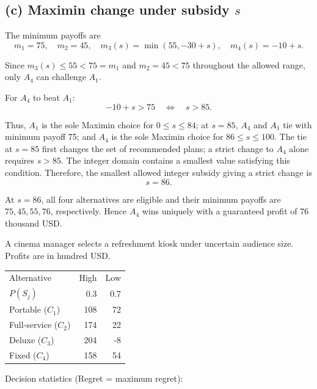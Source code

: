 \secInicio[sec:q1]

\label{sol:q1c}
\subsection*{(c) Maximin change under subsidy $s$ }

The minimum payoffs are
\[
m_1=75,\quad m_2=45,\quad
m_3(s)=\min(55,-30+s),\quad m_4(s)=-10+s.
\]

Since $m_3(s)\le55<75=m_1$ and $m_2=45<75$ throughout
the allowed range, only $A_4$ can challenge $A_1$.

For $A_4$ to beat $A_1$:
\[
-10+s>75
\quad\Longleftrightarrow\quad s>85.
\]

Thus, $A_1$ is the sole Maximin choice for $0\le s\le84$;
at $s=85$, $A_4$ and $A_1$ tie with minimum payoff 75;
and $A_4$ is the sole Maximin choice for $86\le s\le100$.
The tie at $s=85$ first changes the set of recommended plans;
a strict change to $A_4$ alone requires $s>85$.
The integer domain contains a smallest value satisfying this condition.
Therefore, the smallest allowed integer subsidy giving a strict change is
\[
\boxed{s=86}.
\]

At $s=86$, all four alternatives are eligible and their minimum
payoffs are $75,45,55,76$, respectively. Hence $A_4$ wins uniquely
with a guaranteed profit of 76 thousand USD.
\secInicio[sec:q1]



A cinema manager selects a refreshment kiosk under uncertain audience size. Profits are in hundred USD.

\begin{center}\small\setlength{\tabcolsep}{4pt}
	\begin{tabular}{lrr}\toprule
		Alternative & High & Low\\
		$P(S_j)$ & 0.3 & 0.7\\ \midrule
				Portable ($C_1$) & 108 & 72\\
		Full-service ($C_2$) & 174 & 22\\
		Deluxe ($C_3$) & 204 & -8\\
		Fixed ($C_4$) & 158 & 54\\
		\bottomrule
	\end{tabular}
\end{center} \vspace{-3mm}

Decision statistics (Regret = maximum regret):

